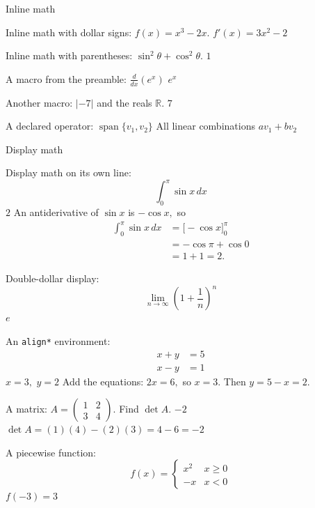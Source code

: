 \documentclass{article}
\newcommand{\R}{\mathbb{R}}
\newcommand{\dd}[1]{\frac{d}{d#1}}
\newcommand{\abs}[1]{\left|#1\right|}
\DeclareMathOperator{\Span}{span}
\begin{document}
\begin{category}{Inline math}
  \begin{clue}
    Inline math with dollar signs: $f(x) = x^3 - 2x.$
  \response
    $f'(x) = 3x^2 - 2$
  \end{clue}
  \begin{clue}
    Inline math with parentheses: \(\sin^2\theta + \cos^2\theta\).
  \response
    \(1\)
  \end{clue}
  \begin{clue}
    A macro from the preamble: $\dd{x}\left(e^{x}\right)$
  \response
    $e^x$
  \end{clue}
  \begin{clue}
    Another macro: $\abs{-7}$ and the reals $\R.$
  \response
    $7$
  \end{clue}
  \begin{clue}
    A declared operator: $\Span\{v_1, v_2\}$
  \response
    All linear combinations $a v_1 + b v_2$
  \end{clue}
\end{category}

\begin{category}{Display math}
  \begin{clue}
    Display math on its own line:
    \[ \int_0^{\pi} \sin x \, dx \]
  \response
    $2$
  \solution
    An antiderivative of $\sin x$ is $-\cos x,$ so
    \begin{align*}
      \int_0^{\pi} \sin x \, dx &= \Big[-\cos x\Big]_0^{\pi} \\
        &= -\cos\pi + \cos 0 \\
        &= 1 + 1 = 2.
    \end{align*}
  \end{clue}
  \begin{clue}
    Double-dollar display:
    $$ \lim_{n \to \infty} \left(1 + \frac{1}{n}\right)^n $$
  \response
    $e$
  \end{clue}
  \begin{clue}
    An \texttt{align*} environment:
    \begin{align*}
      x + y &= 5 \\
      x - y &= 1
    \end{align*}
  \response
    $x = 3,$ $y = 2$
  \solution
    Add the equations: $2x = 6,$ so $x = 3.$ Then $y = 5 - x = 2.$
  \end{clue}
  \begin{clue}[doubledown]
    A matrix: $A = \begin{pmatrix} 1 & 2 \\ 3 & 4 \end{pmatrix}.$ Find $\det A.$
  \response
    $-2$
  \solution
    $\det A = (1)(4) - (2)(3) = 4 - 6 = -2$
  \end{clue}
  \begin{clue}
    A piecewise function:
    \[ f(x) = \begin{cases} x^2 & x \ge 0 \\ -x & x < 0 \end{cases} \]
  \response
    $f(-3) = 3$
  \end{clue}
\end{category}
\end{document}
